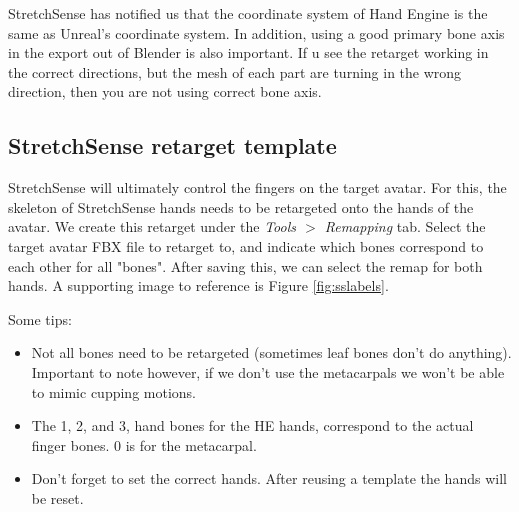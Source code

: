 \documentclass{uva-inf-article}
\begin{document}
StretchSense has notified us that the coordinate system of Hand Engine is the same as Unreal's coordinate system. In addition, using a good primary bone axis in the export out of Blender is also important. If u see the retarget working in the correct directions, but the mesh of each part are turning in the wrong direction, then you are not using correct bone axis.


\subsection{StretchSense retarget template}
StretchSense will ultimately control the fingers on the target avatar. For this, the skeleton of StretchSense hands needs to be retargeted onto the hands of the avatar. We create this retarget under the \textit{Tools $>$ Remapping} tab. Select the target avatar FBX file to retarget to, and indicate which bones correspond to each other for all "bones". After saving this, we can select the remap for both hands. A supporting image to reference is Figure \ref{fig:sslabels}.

Some tips:
\begin{itemize}
    \item Not all bones need to be retargeted (sometimes leaf bones don't do anything).\\Important to note however, if we don't use the metacarpals we won't be able to mimic cupping motions.
    \item The 1, 2, and 3, hand bones for the HE hands, correspond to the actual finger bones. 0 is for the metacarpal.
    \item Don't forget to set the correct hands. After reusing a template the hands will be reset.
\end{itemize}
\end{document}

